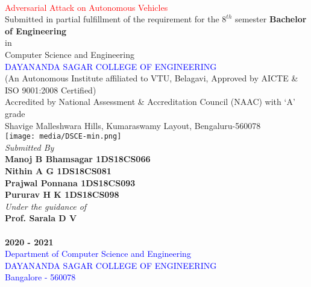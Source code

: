 \documentclass[ 12pt,a4paper,twocolumn,fleqn]{article}
\begin{document}
\onecolumn
\begin{center}
 \\
\smallskip
\textcolor{red}{\LARGE{Adversarial Attack on Autonomous Vehicles}} \\
\large{Submitted in partial fulfillment of the requirement for the $8^{th}$ semester}
\large{\textbf{Bachelor of Engineering}} \\
\large{in} \\
\large{Computer Science and Engineering} \\
\textcolor{blue}{\LARGE{DAYANANDA SAGAR COLLEGE OF ENGINEERING}} \\
\footnotesize{(An Autonomous Institute affiliated to VTU, Belagavi, Approved by AICTE \& ISO 9001:2008 Certified)} \\
\footnotesize{Accredited by National Assessment \& Accreditation Council (NAAC) with ‘A’ grade}  \\
\footnotesize{Shavige Malleshwara Hills, Kumaraswamy Layout, Bengaluru-560078} \\
\texttt{[image: media/DSCE-min.png]} \\
\textit{Submitted By} \\
\textbf{Manoj B Bhamsagar \space 1DS18CS066} \\
\textbf{Nithin A G \space 1DS18CS081} \\
\textbf{Prajwal Ponnana \space 1DS18CS093} \\
\textbf{Pururav H K \space 1DS18CS098} \\
\textit{Under the guidance of} \\
\textbf{Prof. Sarala D V}\\
\\
\Large{\textbf{2020 - 2021}} \\
\textcolor{blue}{\Large{Department of Computer Science and Engineering}} \\
\textcolor{blue}{\Large{DAYANANDA SAGAR COLLEGE OF ENGINEERING}} \\
\textcolor{blue}{\Large{Bangalore - 560078}} \\
\end{center}
\newpage
  \pagestyle{fancy}
\thisfancypage{%
  \setlength{\fboxsep}{20pt}\doublebox}{}
\end{document}
